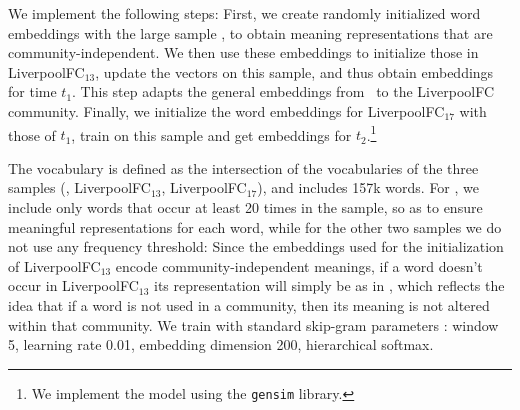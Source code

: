 We implement the following steps:
First, we create  randomly initialized word embeddings with the large sample \redd, to obtain meaning
representations that are community-independent.
We then use these embeddings
to initialize those in LiverpoolFC$_{13}$, update the vectors on this
sample, and thus obtain embeddings for time $t_1$. This step
adapts the general embeddings from \redd\  to the
LiverpoolFC community. Finally, we
initialize the word embeddings for LiverpoolFC$_{17}$ with those of $t_1$, train on this sample and get embeddings for $t_2$.\footnote{We implement the model
using the \texttt{gensim} library.}   


The vocabulary is defined as the intersection of the
vocabularies of the three samples (\redd, LiverpoolFC$_{13}$,
LiverpoolFC$_{17}$), and includes 157k words.
For \redd, we include only words that occur at least 20 times in the
sample, so as to ensure meaningful representations for each word,
while for the other two samples we do not use any frequency
threshold: Since the embeddings used for the initialization of
LiverpoolFC$_{13}$ encode community-independent meanings, if a word doesn't occur in
LiverpoolFC$_{13}$ its representation will simply be as in \redd,
which reflects the idea that if a word is not used in a community, then its meaning is not altered within
that community. 
We train with standard skip-gram parameters \cite{levy2015improving}: window 5, learning rate 0.01, embedding dimension 200, hierarchical softmax.



